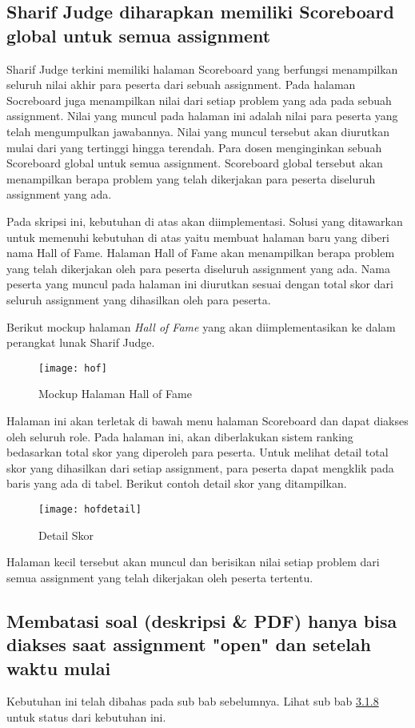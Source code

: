 \subsection{Sharif Judge diharapkan memiliki Scoreboard global untuk semua assignment}
Sharif Judge terkini memiliki halaman Scoreboard yang berfungsi menampilkan seluruh nilai akhir para peserta dari sebuah assignment. Pada halaman Socreboard juga menampilkan nilai dari setiap problem yang ada pada sebuah assignment. Nilai yang muncul pada halaman ini adalah nilai para peserta yang telah mengumpulkan jawabannya. Nilai yang muncul tersebut akan diurutkan mulai dari yang tertinggi hingga terendah. Para dosen menginginkan sebuah Scoreboard global untuk semua assignment. Scoreboard global tersebut akan menampilkan berapa problem yang telah dikerjakan para peserta diseluruh assignment yang ada. 

Pada skripsi ini, kebutuhan di atas akan diimplementasi. Solusi yang ditawarkan untuk memenuhi kebutuhan di atas yaitu membuat halaman baru yang diberi nama Hall of Fame. Halaman Hall of Fame akan menampilkan berapa problem yang telah dikerjakan oleh para peserta diseluruh assignment yang ada. Nama peserta yang muncul pada halaman ini diurutkan sesuai dengan total skor dari seluruh assignment yang dihasilkan oleh para peserta.

Berikut mockup halaman \textit{Hall of Fame} yang akan diimplementasikan ke dalam perangkat lunak Sharif Judge.
\begin{figure}[H]
	\centering  
	\texttt{[image: hof]}  
	\caption[Mockup Halaman Hall of Fame]{Mockup Halaman Hall of Fame} 
	\label{fig:hof} 
\end{figure}
Halaman ini akan terletak di bawah menu halaman Scoreboard dan dapat diakses oleh seluruh role. Pada halaman ini, akan diberlakukan sistem ranking bedasarkan total skor yang diperoleh para peserta. Untuk melihat detail total skor yang dihasilkan dari setiap assignment, para peserta dapat mengklik pada baris yang ada di tabel. Berikut contoh detail skor yang ditampilkan.
\begin{figure}[H]
	\centering  
	\texttt{[image: hofdetail]}  
	\caption[Detail Skor]{Detail Skor} 
	\label{fig:hofdetail} 
\end{figure}
Halaman kecil tersebut akan muncul dan berisikan nilai setiap problem dari semua assignment yang telah dikerjakan oleh peserta tertentu.

\subsection{Membatasi soal (deskripsi \& PDF) hanya bisa diakses saat assignment "open" dan setelah waktu mulai}
Kebutuhan ini telah dibahas pada sub bab sebelumnya. Lihat sub bab \hyperref[subsec:membatasisoal]{3.1.8} untuk status dari kebutuhan ini.

